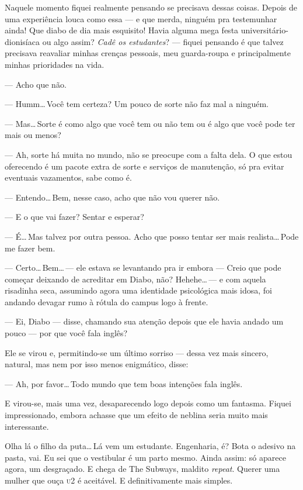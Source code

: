 Naquele momento fiquei realmente pensando se precisava dessas coisas. Depois de uma experiência louca como essa --- e que merda, ninguém pra testemunhar ainda! Que diabo de dia mais esquisito! Havia alguma mega festa u\-ni\-ver\-si\-tá\-ri\-o-dio\-ni\-sí\-a\-ca ou algo assim? \emph{Cadê os estudantes}? --- fiquei pensando é que talvez precisava reavaliar minhas crenças pessoais, meu guarda-roupa e principalmente minhas prioridades na vida.

--- Acho que não.

--- Humm\ldots\,Você tem certeza? Um pouco de sorte não faz mal a ninguém.

--- Mas\ldots\,Sorte é como algo que você tem ou não tem ou é algo que você pode ter mais ou menos?

--- Ah, sorte há muita no mundo, não se preocupe com a falta dela. O que estou oferecendo é um pacote extra de sorte e serviços de manutenção, só pra evitar eventuais vazamentos, sabe como é.

--- Entendo\ldots\,Bem, nesse caso, acho que não vou querer não.

--- E o que vai fazer? Sentar e esperar?

--- É\ldots\,Mas talvez por outra pessoa. Acho que posso tentar ser mais realista\ldots\,Pode me fazer bem.

--- Certo\ldots\,Bem\ldots\,--- ele estava se levantando pra ir embora --- Creio que pode começar deixando de acreditar em Diabo, não? Hehehe\ldots\,--- e com aquela risadinha seca, as\-su\-min\-do agora uma identidade psicológica mais idosa, foi andando devagar rumo à rótula do campus logo à frente.

--- Ei, Diabo --- disse, chamando sua atenção depois que ele havia andado um pouco --- por que você fala inglês?

Ele se virou e, permitindo-se um último sorriso --- dessa vez mais sincero, natural, mas nem por isso menos enigmático, disse:

--- Ah, por favor\ldots\,Todo mundo que tem boas intenções fala inglês.

E virou-se, mais uma vez, desaparecendo logo depois como um fantasma. Fiquei impressionado, embora achasse que um efeito de neblina seria muito mais interessante.

Olha lá o filho da puta\ldots\,Lá vem um estudante. Engenharia, é? Bota o adesivo na pasta, vai. Eu sei que o vestibular é um parto mesmo. Ainda assim: só aparece agora, um desgraçado. E chega de The Subways, maldito \emph{repeat}. Querer uma mulher que ouça \textsc{u}2 é aceitável. E definitivamente mais simples.
